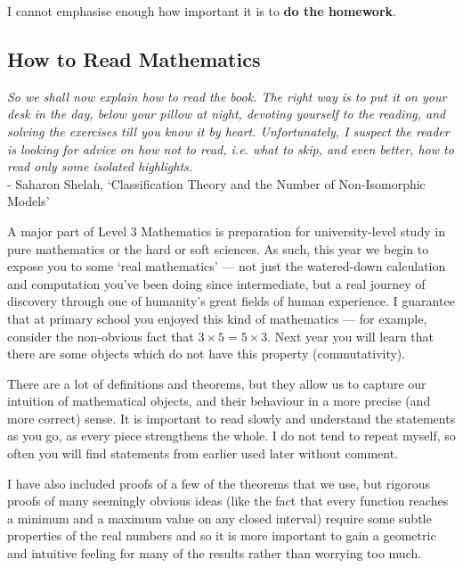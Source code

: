I cannot emphasise enough how important it is to \textbf{do the homework}.

\subsection*{How to Read Mathematics}
\begin{center}
  \textit{So we shall now explain how to read the book. The right way is to put it on your desk in the day, below your pillow at night, devoting yourself to the reading, and solving the exercises till you know it by heart. Unfortunately, I suspect the reader is looking for advice on how not to read, i.e. what to skip, and even better, how to read only some isolated highlights.}\\ - Saharon Shelah, `Classification Theory and the Number of Non-Isomorphic Models'
\end{center}

A major part of Level 3 Mathematics is preparation for university-level study in pure mathematics or the hard or soft sciences. As such, this
year we begin to expose you to some `real mathematics' --- not just the watered-down calculation and computation you've been doing since intermediate,
but a real journey of discovery through one of humanity's great fields of human experience. I guarantee that at primary school you enjoyed
this kind of mathematics --- for example, consider the non-obvious fact that $ 3 \times 5 = 5 \times 3 $. Next year you will learn that there are
some objects which do not have this property (commutativity).

There are a lot of definitions and theorems, but they allow us to capture our intuition of mathematical objects, and their behaviour in a more
precise (and more correct) sense. It is important to read slowly and understand the statements as you go, as every piece strengthens the whole.
I do not tend to repeat myself, so often you will find statements from earlier used later without comment.

I have also included proofs of a few of the theorems that we use, but rigorous proofs of many seemingly obvious ideas (like the fact that every function
reaches a minimum and a maximum value on any closed interval) require some subtle properties of the real numbers and so it is more important to gain a
geometric and intuitive feeling for many of the results rather than worrying too much.


